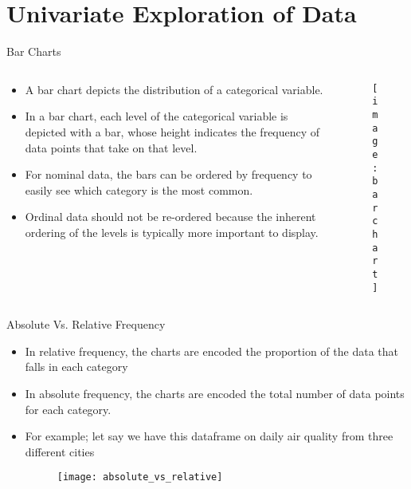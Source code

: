 \documentclass[12pt]{beamer}
\begin{document}
    \section{Univariate Exploration of Data}
    \begin{frame}{Bar Charts}
    	\begin{columns}
    		\begin{column}{0.6\textwidth}
    			\begin{itemize}
    				\item A bar chart depicts the distribution of a categorical variable.
    				\item In a bar chart, each level of the categorical variable is depicted with a bar, whose height indicates the frequency of data points that take on that level.
    				\item For nominal data, the bars can be ordered by frequency to easily see which category is the most common.
    				\item Ordinal data should not be re-ordered because the inherent ordering of the levels is typically more important to display.
    			\end{itemize}
    		\end{column}
    	    \begin{column}{0.4\textwidth}
    	    	\begin{figure}
    	    		\centering
    	    		\texttt{[image: barchart]}
    	    	\end{figure}
    	    \end{column}
    	\end{columns}
    \end{frame}
    \begin{frame}{Absolute Vs. Relative Frequency}
    	\begin{itemize}
    		\item  In relative frequency, the charts are encoded the proportion of the data that falls in each category
    		\item In absolute frequency, the charts are encoded the total number of data points for each category.
    		\item For example; let say we have this dataframe on daily air quality from three different cities
    		\begin{figure}
    			\centering
    			\texttt{[image: absolute\_vs\_relative]}
    		\end{figure}
    		
    	\end{itemize}
    \end{frame}
\end{document}
